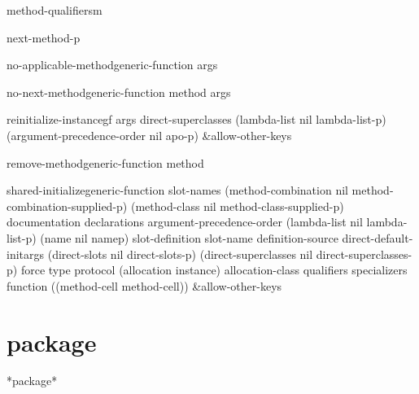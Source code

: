 \begin{generic}{method-qualifiers}{m}{}
  
\end{generic}

\begin{local-function}{next-method-p}{}{}
  
\end{local-function}

\begin{generic}{no-applicable-method}{generic-function \rest args}{}
  
\end{generic}

\begin{generic}{no-next-method}{generic-function method \rest args}{}
  
\end{generic}

\begin{generic}{reinitialize-instance}{gf \rest args \key direct-superclasses (lambda-list nil lambda-list-p)
 (argument-precedence-order nil apo-p) &allow-other-keys}{}
  
\end{generic}

\begin{generic}{remove-method}{generic-function method}{}
  
\end{generic}

\begin{generic}{shared-initialize}{generic-function slot-names \key
 (method-combination nil method-combination-supplied-p)
 (method-class nil method-class-supplied-p) documentation declarations
 argument-precedence-order (lambda-list nil lambda-list-p) (name nil namep)
 slot-definition slot-name definition-source direct-default-initargs
 (direct-slots nil direct-slots-p)
 (direct-superclasses nil direct-superclasses-p) force type protocol
 (allocation instance) allocation-class qualifiers specializers function
 ((method-cell method-cell)) &allow-other-keys}{}
  
\end{generic}

\section{package}

\begin{variable}{*package*}{}{}
  
\end{variable}

